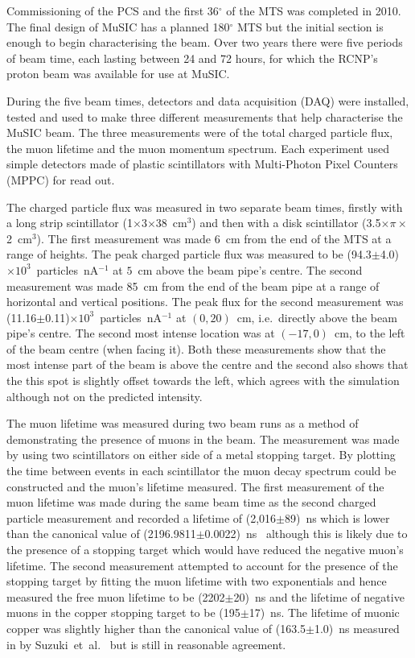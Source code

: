 Commissioning of the PCS and the first 36\(^{\circ}\) of the MTS was completed in 2010. The final design of MuSIC has a planned 180\(^{\circ}\) MTS but the initial section is enough to begin characterising the beam. Over two years there were five periods of beam time, each lasting between 24 and 72 hours, for which the RCNP's proton beam was available for use at MuSIC. 

During the five beam times, detectors and data acquisition (DAQ) were installed, tested and used to make three different measurements that help characterise the MuSIC beam. The three measurements were of the total charged particle flux, the muon lifetime and the muon momentum spectrum. Each experiment used simple detectors made of plastic scintillators with Multi-Photon Pixel Counters (MPPC) for read out. 

The charged particle flux was measured in two separate beam times, firstly with a long strip scintillator (1\(\times\)3\(\times\)38~cm\(^3\)) and then with a disk scintillator (3.5\(\times \pi \times\)2~cm\(^3\)). The first measurement was made 6~cm from the end of the MTS at a range of heights. The peak charged particle flux was measured to be (94.3\(\pm\)4.0)\(\times10^3\)~particles~nA\(^{-1}\) at \(5\)~cm above the beam pipe's centre. The second measurement was made 85~cm from the end of the beam pipe at a range of horizontal and vertical positions. The peak flux for the second measurement was (11.16\(\pm\)0.11)\(\times10^3\)~particles~nA\(^{-1}\) at \((0, 20)\)~cm, i.e.\ directly above the beam pipe's centre. The second most intense location was at \((-17, 0)\)~cm, to the left of the beam centre (when facing it). Both these measurements show that the most intense part of the beam is above the centre and the second also shows that the this spot is slightly offset towards the left, which agrees with the simulation although not on the predicted intensity.

The muon lifetime was measured during two beam runs as a method of demonstrating the presence of muons in the beam. The measurement was made by using two scintillators on either side of a metal stopping target. By plotting the time between events in each scintillator the muon decay spectrum could be constructed and the muon's lifetime measured. The first measurement of the muon lifetime was made during the same beam time as the second charged particle measurement and recorded a lifetime of (2,016\(\pm\)89)~ns which is lower than the canonical value of (2196.9811\(\pm\)0.0022)~ns~\cite{pdg} although this is likely due to the presence of a stopping target which would have reduced the negative muon's lifetime. The second measurement attempted to account for the presence of the stopping target by fitting the muon lifetime with two exponentials and hence measured the free muon lifetime to be (2202\(\pm\)20)~ns and the lifetime of negative muons in the copper stopping target to be (195\(\pm\)17)~ns. The lifetime of muonic copper was slightly higher than the canonical value of (163.5\(\pm\)1.0)~ns measured in by Suzuki~et~al.~\cite{suzuki_mu_capture_rates} but is still in reasonable agreement.

